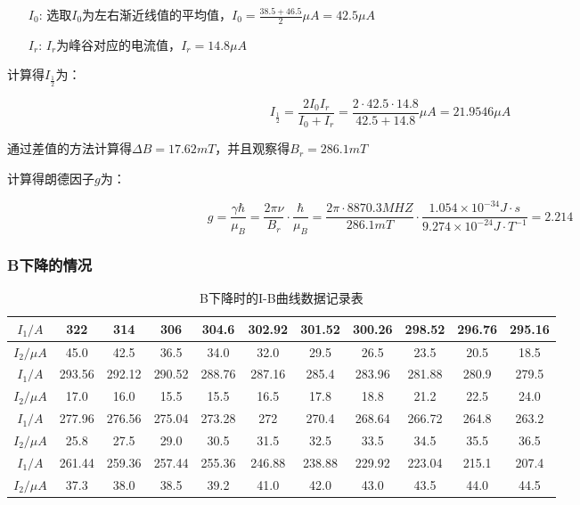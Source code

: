 \documentclass[a4paper,UTF8]{ctexart}
\begin{document}
\begin{enumerate}
    \item[$I_0$:] 选取$I_0$为左右渐近线值的平均值，$I_0 = \frac{38.5+46.5}{2}\mu A=42.5\mu A$
    \item[$I_r$:] $I_r$为峰谷对应的电流值，$I_r = 14.8\mu A$
\end{enumerate}

计算得$I_{\frac{1}{2}}$为：

\begin{equation}
    I_{\frac{1}{2}} = \frac{2 I_0 I_{r}}{I_0 + I_{r}} = \frac{2 \cdot 42.5 \cdot 14.8}{42.5+14.8}\mu A = 21.9546 \mu A
\end{equation}

通过差值的方法计算得$\Delta B = 17.62 mT$，并且观察得$B_r = 286.1 mT$

计算得朗德因子$g$为：

\begin{equation}
    g = \frac{\gamma \hbar}{\mu_B} = \frac{2\pi \nu}{B_r} \cdot \frac{\hbar}{\mu_B} = \frac{2\pi \cdot 8870.3 MHZ}{286.1 mT} \cdot \frac{1.054 \times 10^{-34}J\cdot s}{9.274 \times 10^{-24} J\cdot T^{-1}} = 2.214
\end{equation}

\subsubsection{B下降的情况}

\begin{table}[H]
    \centering
    \begin{tabular}{|c|c|c|c|c|c|c|c|c|c|c|}
    \hline
        $I_1/A$ & 322 & 314 & 306 & 304.6 & 302.92 & 301.52 & 300.26 & 298.52 & 296.76 & 295.16 \\ \hline
        $I_2/\mu A$ & 45.0 & 42.5 & 36.5 & 34.0 & 32.0 & 29.5 & 26.5 & 23.5 & 20.5 & 18.5 \\ \hline
        $I_1/A$ & 293.56 & 292.12 & 290.52 & 288.76 & 287.16 & 285.4 & 283.96 & 281.88 & 280.9 & 279.5 \\ \hline
        $I_2/\mu A$ & 17.0 & 16.0 & 15.5 & 15.5 & 16.5 & 17.8 & 18.8 & 21.2 & 22.5 & 24.0 \\ \hline
        $I_1/A$ & 277.96 & 276.56 & 275.04 & 273.28 & 272 & 270.4 & 268.64 & 266.72 & 264.8 & 263.2 \\ \hline
        $I_2/\mu A$ & 25.8 & 27.5 & 29.0 & 30.5 & 31.5 & 32.5 & 33.5 & 34.5 & 35.5 & 36.5 \\ \hline
        $I_1/A$ & 261.44 & 259.36 & 257.44 & 255.36 & 246.88 & 238.88 & 229.92 & 223.04 & 215.1 & 207.4 \\ \hline
        $I_2/\mu A$ & 37.3 & 38.0 & 38.5 & 39.2 & 41.0 & 42.0 & 43.0 & 43.5 & 44.0 & 44.5 \\ \hline
    \end{tabular}
    \caption{B下降时的I-B曲线数据记录表}
\end{table}
\end{document}
